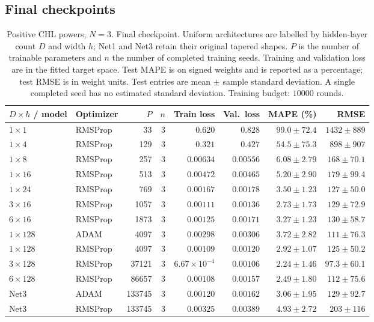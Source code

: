 \clearpage
\subsection{Final checkpoints}
\begin{table}[!htbp]
\centering
\small
\setlength{\tabcolsep}{4pt}
\renewcommand{\arraystretch}{1.18}
\begin{tabular}{@{}llrrrrrr@{}}
\toprule
$D\times h$ / model & Optimizer & $P$ & $n$ & Train loss & Val.\ loss & MAPE (\%) & RMSE \\
\midrule
$1\times 1$ & RMSProp & 33 & 3 & $0.620$ & $0.828$ & $99.0\pm72.4$ & $1432\pm889$ \\
$1\times 4$ & RMSProp & 129 & 3 & $0.321$ & $0.427$ & $54.5\pm75.3$ & $898\pm907$ \\
$1\times 8$ & RMSProp & 257 & 3 & $0.00634$ & $0.00556$ & $6.08\pm2.79$ & $168\pm70.1$ \\
$1\times 16$ & RMSProp & 513 & 3 & $0.00472$ & $0.00465$ & $5.20\pm2.90$ & $179\pm99.4$ \\
$1\times 24$ & RMSProp & 769 & 3 & $0.00167$ & $0.00178$ & $3.50\pm1.23$ & $127\pm50.0$ \\
$3\times 16$ & RMSProp & 1057 & 3 & $0.00111$ & $0.00136$ & $2.73\pm1.73$ & $129\pm72.9$ \\
$6\times 16$ & RMSProp & 1873 & 3 & $0.00125$ & $0.00171$ & $3.27\pm1.23$ & $130\pm58.7$ \\
$1\times 128$ & ADAM & 4097 & 3 & $0.00298$ & $0.00306$ & $3.72\pm2.82$ & $111\pm76.3$ \\
$1\times 128$ & RMSProp & 4097 & 3 & $0.00109$ & $0.00120$ & $2.92\pm1.07$ & $125\pm50.2$ \\
$3\times 128$ & RMSProp & 37121 & 3 & $6.67\times10^{-4}$ & $0.00106$ & $2.24\pm1.46$ & $97.3\pm60.1$ \\
$6\times 128$ & RMSProp & 86657 & 3 & $0.00108$ & $0.00157$ & $2.49\pm1.80$ & $112\pm75.6$ \\
Net3 & ADAM & 133745 & 3 & $0.00120$ & $0.00162$ & $3.06\pm1.95$ & $129\pm92.7$ \\
Net3 & RMSProp & 133745 & 3 & $0.00325$ & $0.00389$ & $4.93\pm2.72$ & $203\pm116$ \\
\bottomrule
\end{tabular}
\caption{\textsf{Positive CHL powers, $N=3$. Final checkpoint. Uniform architectures are labelled by hidden-layer count $D$ and width $h$; Net1 and Net3 retain their original tapered shapes. $P$ is the number of trainable parameters and $n$ the number of completed training seeds. Training and validation loss are in the fitted target space. Test MAPE is on signed weights and is reported as a percentage; test RMSE is in weight units. Test entries are mean $\pm$ sample standard deviation. A single completed seed has no estimated standard deviation. Training budget: $10000$ rounds.}}
\label{tab:depth-chl-N3-positive-integer-final}
\end{table}

